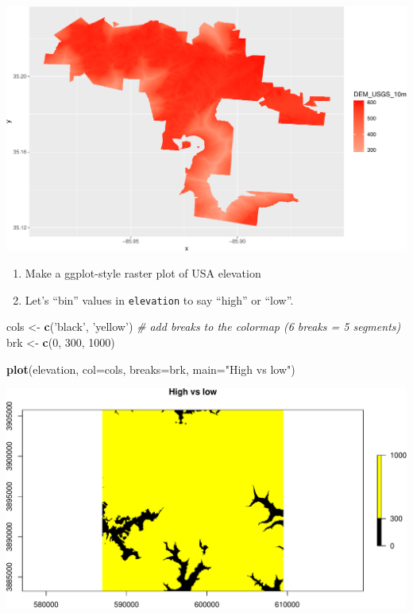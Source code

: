 \documentclass[
]{book}
\newenvironment{Shaded}{\begin{snugshade}}{\end{snugshade}}
\newcommand{\CommentTok}[1]{\textcolor[rgb]{0.56,0.35,0.01}{\textit{#1}}}
\newcommand{\DataTypeTok}[1]{\textcolor[rgb]{0.13,0.29,0.53}{#1}}
\newcommand{\DecValTok}[1]{\textcolor[rgb]{0.00,0.00,0.81}{#1}}
\newcommand{\KeywordTok}[1]{\textcolor[rgb]{0.13,0.29,0.53}{\textbf{#1}}}
\newcommand{\NormalTok}[1]{#1}
\newcommand{\StringTok}[1]{\textcolor[rgb]{0.31,0.60,0.02}{#1}}
\begin{document}
\includegraphics{figures/unnamed-chunk-438-1.pdf}

\begin{enumerate}
\def\labelenumi{\arabic{enumi}.}
\setcounter{enumi}{31}
\item
  Make a ggplot-style raster plot of USA elevation
\item
  Let's ``bin'' values in \texttt{elevation} to say ``high'' or ``low''.
\end{enumerate}

\begin{Shaded}
\begin{Highlighting}[]
\NormalTok{cols <-}\StringTok{ }\KeywordTok{c}\NormalTok{(}\StringTok{'black'}\NormalTok{, }\StringTok{'yellow'}\NormalTok{)}
\CommentTok{# add breaks to the colormap (6 breaks = 5 segments)}
\NormalTok{brk <-}\StringTok{ }\KeywordTok{c}\NormalTok{(}\DecValTok{0}\NormalTok{, }\DecValTok{300}\NormalTok{, }\DecValTok{1000}\NormalTok{)}

\KeywordTok{plot}\NormalTok{(elevation, }\DataTypeTok{col=}\NormalTok{cols, }\DataTypeTok{breaks=}\NormalTok{brk, }\DataTypeTok{main=}\StringTok{"High vs low"}\NormalTok{)}
\end{Highlighting}
\end{Shaded}

\includegraphics{figures/unnamed-chunk-439-1.pdf}
\end{document}
